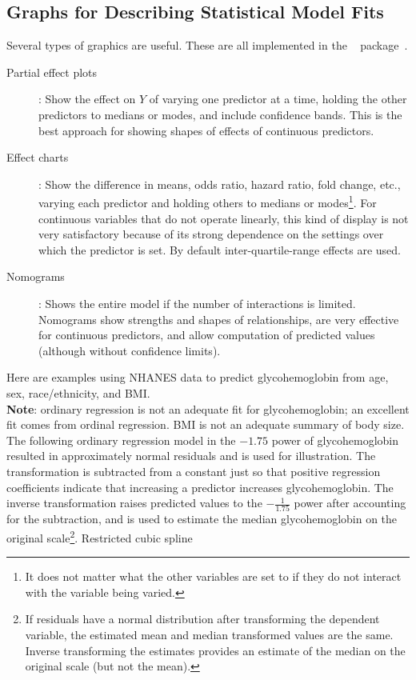 \subsection{Graphs for Describing Statistical Model Fits}
Several types of graphics are useful.  These are all implemented in
the \R\  package~\cite{rrms}.
\begin{description}
  \item[Partial effect plots]: Show the effect on $Y$ of varying one
    predictor at a time, holding the other predictors to medians or
    modes, and include confidence bands.  This is the best approach
    for showing shapes of effects of continuous predictors.
  \item[Effect charts]: Show the difference in means, odds ratio,
    hazard ratio, fold change, etc., varying each predictor and
    holding others to medians or modes\footnote{It does not matter
      what the other variables are set to if they do not interact with
      the variable being varied.}.  For continuous variables that do
    not operate linearly, this kind of display is not very
    satisfactory because of its strong dependence on the settings over
    which the predictor is set.  By default inter-quartile-range
    effects are used.
  \item[Nomograms]: Shows the entire model if the number of
    interactions is limited.  Nomograms show strengths and shapes of
    relationships, are very effective for continuous predictors, and
    allow computation of predicted values (although without confidence limits).
\end{description}
Here are examples using NHANES data to predict glycohemoglobin from
age, sex, race/ethnicity, and BMI.\\
\textbf{Note}: ordinary regression is not an adequate fit for glycohemoglobin;
an excellent fit comes from ordinal regression.  BMI is not an
adequate summary of body size.  The following
ordinary regression model in the $-1.75$ power of glycohemoglobin
resulted in approximately normal residuals and is used for
illustration.  The transformation is subtracted from a constant just
so that positive regression coefficients indicate that increasing a
predictor increases glycohemoglobin.  The inverse transformation
raises predicted values to 
the $-\frac{1}{1.75}$ power after accounting for the subtraction, and
is used to estimate the median glycohemoglobin on 
the original scale\footnote{If residuals have a normal distribution
  after transforming the dependent variable, the estimated mean and
  median transformed values are the same.  Inverse transforming the
  estimates provides an estimate of the median on the original scale
  (but not the mean).}.  Restricted cubic spline 

